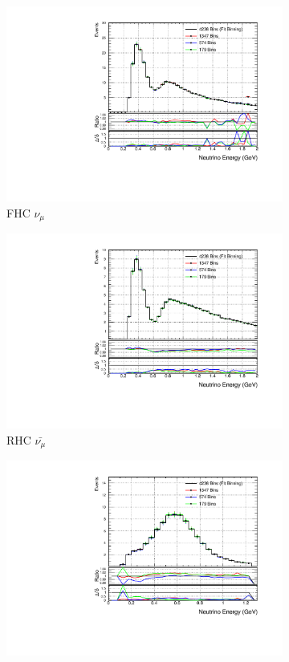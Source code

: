 \begin{figure}
\centering
\begin{subfigure}{.49\textwidth}
  \centering
  \includegraphics[width=0.95\linewidth]{figs/detbin_numu}
  \caption{FHC $\nu_{\mu}$}
\end{subfigure}
\begin{subfigure}{.49\textwidth}
  \centering
  \includegraphics[width=0.95\linewidth]{figs/detbin_numubar}
  \caption{RHC $\bar{\nu_{\mu}}$}
\end{subfigure}
\begin{subfigure}{.49\textwidth}
  \centering
  \includegraphics[width=0.95\linewidth]{figs/detbin_nue}

\end{subfigure}
\end{figure}
